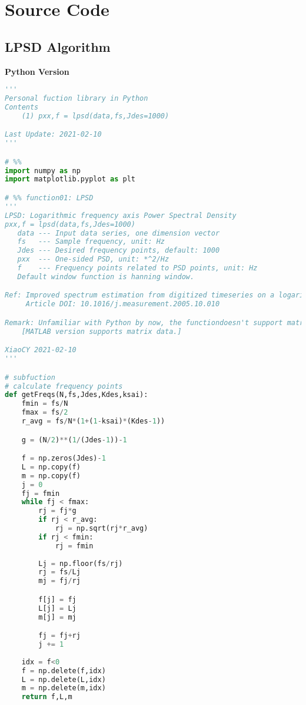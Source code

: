 \section{Source Code}

\subsection{LPSD Algorithm}


{\noindent \bfseries Python Version}


\begin{lstlisting}[language=Python]
'''
Personal fuction library in Python
Contents
    (1) pxx,f = lpsd(data,fs,Jdes=1000)

Last Update: 2021-02-10
'''

# %%
import numpy as np
import matplotlib.pyplot as plt

# %% function01: LPSD
'''
LPSD: Logarithmic frequency axis Power Spectral Density
pxx,f = lpsd(data,fs,Jdes=1000)
   data --- Input data series, one dimension vector
   fs   --- Sample frequency, unit: Hz
   Jdes --- Desired frequency points, default: 1000
   pxx  --- One-sided PSD, unit: *^2/Hz
   f    --- Frequency points related to PSD points, unit: Hz
   Default window function is hanning window.

Ref: Improved spectrum estimation from digitized timeseries on a logarithmic frequency axis
     Article DOI: 10.1016/j.measurement.2005.10.010

Remark: Unfamiliar with Python by now, the functiondoesn't support matrix data by now.
    [MATLAB version supports matrix data.]

XiaoCY 2021-02-10
'''

# subfuction
# calculate frequency points
def getFreqs(N,fs,Jdes,Kdes,ksai):
    fmin = fs/N
    fmax = fs/2
    r_avg = fs/N*(1+(1-ksai)*(Kdes-1))

    g = (N/2)**(1/(Jdes-1))-1

    f = np.zeros(Jdes)-1
    L = np.copy(f)
    m = np.copy(f)
    j = 0
    fj = fmin
    while fj < fmax:
        rj = fj*g
        if rj < r_avg:
            rj = np.sqrt(rj*r_avg)
        if rj < fmin:
            rj = fmin
        
        Lj = np.floor(fs/rj)
        rj = fs/Lj
        mj = fj/rj

        f[j] = fj
        L[j] = Lj
        m[j] = mj

        fj = fj+rj
        j += 1
    
    idx = f<0
    f = np.delete(f,idx)
    L = np.delete(L,idx)
    m = np.delete(m,idx)
    return f,L,m


\end{lstlisting}
